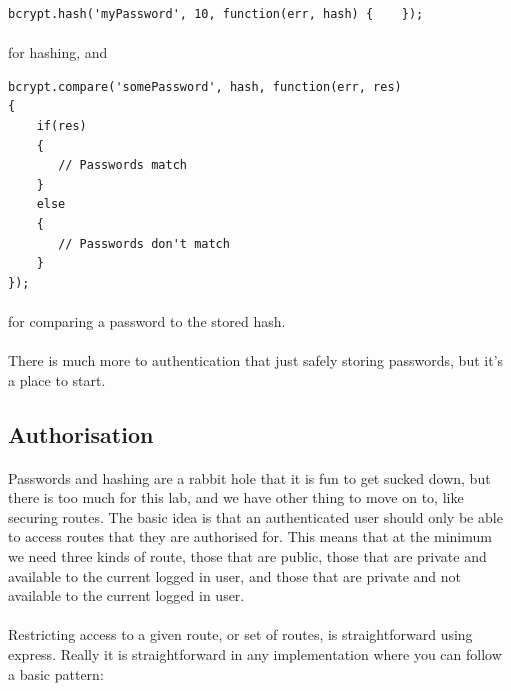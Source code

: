 \documentclass[10pt, a4paper, twosize]{article}
\begin{document}
\begin{lstlisting}
bcrypt.hash('myPassword', 10, function(err, hash) {    });
\end{lstlisting}
\paragraph{} for hashing, and 

\begin{lstlisting}
bcrypt.compare('somePassword', hash, function(err, res)
{
    if(res)
    {
       // Passwords match
    } 
    else
    {
       // Passwords don't match
    } 
});
\end{lstlisting}
\paragraph{} for comparing a password to the stored hash.

\paragraph{} There is much more to authentication that just safely storing passwords, but it's a place to start.

\subsection*{Authorisation}
\paragraph{} Passwords and hashing are a rabbit hole that it is fun to get sucked down, but there is too much for this lab, and we have other thing to move on to, like securing routes. The basic idea is that an authenticated user should only be able to access routes that they are authorised for. This means that at the minimum we need three kinds of route, those that are public, those that are private and available to the current logged in user, and those that are private and not available to the current logged in user.

\paragraph{} Restricting access to a given route, or set of routes, is straightforward using express. Really it is straightforward in any implementation where you can follow a basic pattern:
\end{document}
